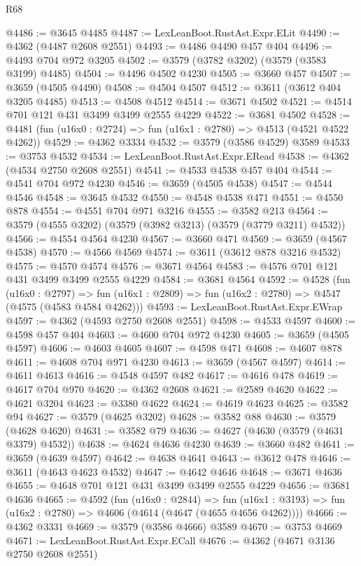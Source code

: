 \begin{lexlean}{R68}
\begin{coremodule}
@4486 := @3645 @4485
@4487 := LexLeanBoot.RustAst.Expr.ELit
@4490 := @4362 (@4487 @2608 @2551)
@4493 := @4486 @4490 @457 @404
@4496 := @4493 @704 @972 @3205
@4502 := @3579 (@3782 @3202) (@3579 (@3583 @3199) @4485)
@4504 := @4496 @4502 @4230
@4505 := @3660 @457
@4507 := @3659 (@4505 @4490)
@4508 := @4504 @4507
@4512 := @3611 (@3612 @404 @3205 @4485)
@4513 := @4508 @4512
@4514 := @3671 @4502
@4521 := @4514 @701 @121 @431 @3499 @3499 @2555 @4229
@4522 := @3681 @4502
@4528 := @4481 (fun (u16x0 : @2724) => fun (u16x1 : @2780) => @4513 (@4521 @4522 @4262))
@4529 := @4362 @3334
@4532 := @3579 (@3586 @4529) @3589
@4533 := @3753 @4532
@4534 := LexLeanBoot.RustAst.Expr.ERead
@4538 := @4362 (@4534 @2750 @2608 @2551)
@4541 := @4533 @4538 @457 @404
@4544 := @4541 @704 @972 @4230
@4546 := @3659 (@4505 @4538)
@4547 := @4544 @4546
@4548 := @3645 @4532
@4550 := @4548 @4538 @471
@4551 := @4550 @878
@4554 := @4551 @704 @971 @3216
@4555 := @3582 @213
@4564 := @3579 (@4555 @3202) (@3579 (@3982 @3213) (@3579 (@3779 @3211) @4532))
@4566 := @4554 @4564 @4230
@4567 := @3660 @471
@4569 := @3659 (@4567 @4538)
@4570 := @4566 @4569
@4574 := @3611 (@3612 @878 @3216 @4532)
@4575 := @4570 @4574
@4576 := @3671 @4564
@4583 := @4576 @701 @121 @431 @3499 @3499 @2555 @4229
@4584 := @3681 @4564
@4592 := @4528
    (fun (u16x0 : @2797) =>
    fun (u16x1 : @2809) => fun (u16x2 : @2780) => @4547 (@4575 (@4583 @4584 @4262)))
@4593 := LexLeanBoot.RustAst.Expr.EWrap
@4597 := @4362 (@4593 @2750 @2608 @2551)
@4598 := @4533 @4597
@4600 := @4598 @457 @404
@4603 := @4600 @704 @972 @4230
@4605 := @3659 (@4505 @4597)
@4606 := @4603 @4605
@4607 := @4598 @471
@4608 := @4607 @878
@4611 := @4608 @704 @971 @4230
@4613 := @3659 (@4567 @4597)
@4614 := @4611 @4613
@4616 := @4548 @4597 @482
@4617 := @4616 @478
@4619 := @4617 @704 @970
@4620 := @4362 @2608
@4621 := @2589 @4620
@4622 := @4621 @3204
@4623 := @3380 @4622
@4624 := @4619 @4623
@4625 := @3582 @94
@4627 := @3579 (@4625 @3202)
@4628 := @3582 @88
@4630 := @3579 (@4628 @4620)
@4631 := @3582 @79
@4636 := @4627 (@4630 (@3579 (@4631 @3379) @4532))
@4638 := @4624 @4636 @4230
@4639 := @3660 @482
@4641 := @3659 (@4639 @4597)
@4642 := @4638 @4641
@4643 := @3612 @478
@4646 := @3611 (@4643 @4623 @4532)
@4647 := @4642 @4646
@4648 := @3671 @4636
@4655 := @4648 @701 @121 @431 @3499 @3499 @2555 @4229
@4656 := @3681 @4636
@4665 := @4592
    (fun (u16x0 : @2844) =>
    fun (u16x1 : @3193) => fun (u16x2 : @2780) => @4606 (@4614 (@4647 (@4655 @4656 @4262))))
@4666 := @4362 @3331
@4669 := @3579 (@3586 @4666) @3589
@4670 := @3753 @4669
@4671 := LexLeanBoot.RustAst.Expr.ECall
@4676 := @4362 (@4671 @3136 @2750 @2608 @2551)

\end{coremodule}
\end{lexlean}
